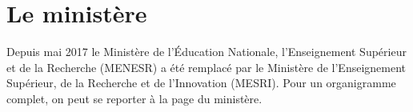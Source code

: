 
\chapter{Le minist\`ere}
\label{chapMinistere}

Depuis mai 2017 le Minist{\`e}re de l'\'Education Nationale,  l'Enseignement Sup{\'e}rieur et de la Recherche (MENESR) a \'et\'e remplac\'e par le Minist{\`e}re  de l'Enseignement Sup{\'e}rieur, de la Recherche et de l'Innovation (MESRI).
\newline
Pour un organigramme complet, on peut se reporter \`a la page du minist\`ere.\\
{\small{}}

